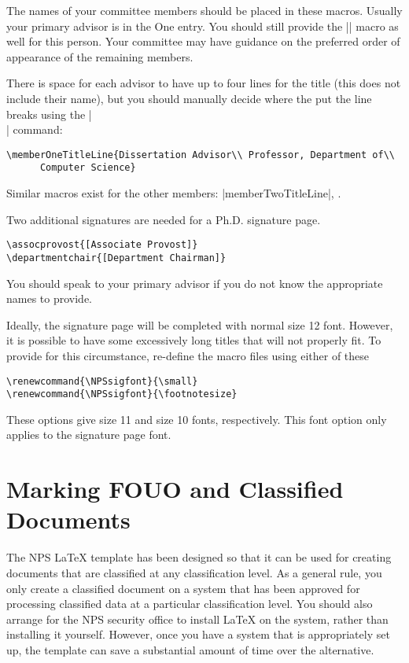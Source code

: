 The names of your committee members should be placed in these macros.  
Usually your primary advisor is in the One entry. You should still 
provide the |\thesisadvisor{[ADVISOR]}| macro as well for this person.  
Your committee may have guidance on the preferred order of appearance of the remaining members.

There is space for each advisor to have up to four lines for the title 
(this does not include their name), but you should manually decide where 
the put the line breaks using the |\\| command:

\begin{Verbatim}
\memberOneTitleLine{Dissertation Advisor\\ Professor, Department of\\ 
      Computer Science}
\end{Verbatim}

Similar macros exist for the other members: |memberTwoTitleLine|, \etc.

Two additional signatures are needed for a Ph.D. signature page.  

\begin{Verbatim}
\assocprovost{[Associate Provost]}
\departmentchair{[Department Chairman]}
\end{Verbatim}

You should speak to your primary advisor if you do not know the appropriate names to provide.

Ideally, the signature page will be completed with normal size 12 font.  However, it is possible to have some excessively long titles that will not properly fit.  To provide for this circumstance, re-define the macro files using either of these

\begin{Verbatim}
\renewcommand{\NPSsigfont}{\small}
\renewcommand{\NPSsigfont}{\footnotesize}
\end{Verbatim}

These options give size 11 and size 10 fonts, respectively.  This font option only applies to the signature page font.



\section{Marking FOUO and Classified Documents}\label{sec:classified}
The NPS \LaTeX{} template has been designed so that it can be used
for creating documents that are 
classified at any classification level. As a general rule, you only
create a classified document on a system that has been approved for
processing classified data at a particular classification level. You
should also arrange for the NPS security office to install \LaTeX{} on
the system, rather than installing it yourself. However, once you have
a system that is appropriately set up, the template can save a
substantial amount of time over the alternative.

